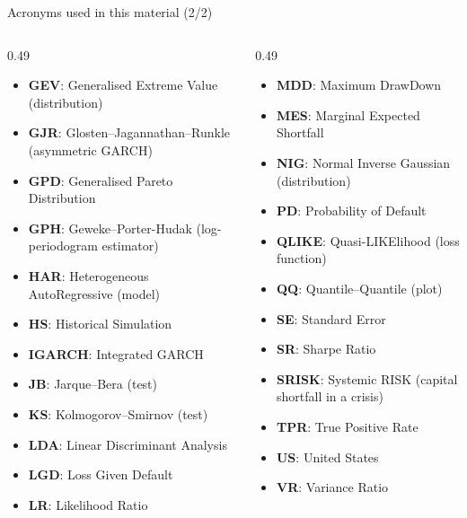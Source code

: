 \begin{frame}{Acronyms used in this material (2/2)}
\begin{columns}[T]
\begin{column}{0.49\textwidth}
\begin{itemize}\setlength{\itemsep}{0pt}
    \item \textbf{GEV}: Generalised Extreme Value (distribution)
    \item \textbf{GJR}: Glosten–Jagannathan–Runkle (asymmetric GARCH)
    \item \textbf{GPD}: Generalised Pareto Distribution
    \item \textbf{GPH}: Geweke–Porter-Hudak (log-periodogram estimator)
    \item \textbf{HAR}: Heterogeneous AutoRegressive (model)
    \item \textbf{HS}: Historical Simulation
    \item \textbf{IGARCH}: Integrated GARCH
    \item \textbf{JB}: Jarque–Bera (test)
    \item \textbf{KS}: Kolmogorov–Smirnov (test)
    \item \textbf{LDA}: Linear Discriminant Analysis
    \item \textbf{LGD}: Loss Given Default
    \item \textbf{LR}: Likelihood Ratio
\end{itemize}
\end{column}
\begin{column}{0.49\textwidth}
\begin{itemize}\setlength{\itemsep}{0pt}
    \item \textbf{MDD}: Maximum DrawDown
    \item \textbf{MES}: Marginal Expected Shortfall
    \item \textbf{NIG}: Normal Inverse Gaussian (distribution)
    \item \textbf{PD}: Probability of Default
    \item \textbf{QLIKE}: Quasi-LIKElihood (loss function)
    \item \textbf{QQ}: Quantile–Quantile (plot)
    \item \textbf{SE}: Standard Error
    \item \textbf{SR}: Sharpe Ratio
    \item \textbf{SRISK}: Systemic RISK (capital shortfall in a crisis)
    \item \textbf{TPR}: True Positive Rate
    \item \textbf{US}: United States
    \item \textbf{VR}: Variance Ratio
\end{itemize}
\end{column}
\end{columns}
\end{frame}

